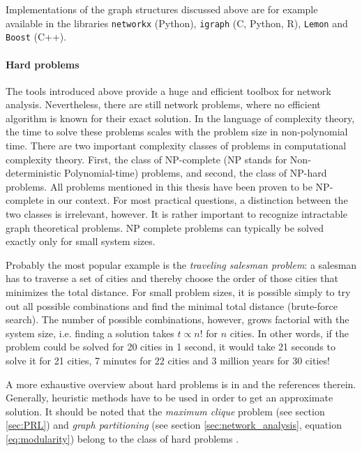 Implementations of the graph structures discussed above are for example available in the libraries \verb"networkx" (Python), \verb"igraph" (C, Python, R), \verb"Lemon" and \verb"Boost" (C++).

\paragraph{Hard problems\color{Cayenne}{.}}
The tools introduced above provide a huge and efficient toolbox for network analysis.
Nevertheless, there are still network problems, where no efficient algorithm is known for their exact solution.
In the language of complexity theory, the time to solve these problems scales with the problem size in non-polynomial time.
There are two important complexity classes of problems in computational complexity theory.
First, the class of NP-complete (NP stands for Non-deterministic Polynomial-time) problems, and second, the class of NP-hard problems.
All problems mentioned in this thesis have been proven to be NP-complete in our context.
For most practical questions, a distinction between the two classes is irrelevant, however.
It is rather important to recognize intractable graph theoretical problems.
NP complete problems can typically be solved exactly only for small system sizes.

Probably the most popular example is the \emph{traveling salesman problem}: a salesman has to traverse a set of cities and thereby choose the order of those cities that minimizes the total distance.
For small problem sizes, it is possible simply to try out all possible combinations and find the minimal total distance (brute-force search).
The number of possible combinations, however, grows factorial with the system size, i.e. finding a solution takes $t\propto n!$ for $n$ cities.
In other words, if the problem could be solved for 20 cities in 1 second, it would take 21 seconds to solve it for 21 cities, 7 minutes for 22 cities and 3 million years for 30 cities!

A more exhaustive overview about hard problems is in \citep{algorithm_design} and the references therein.
Generally, heuristic methods have to be used in order to get an approximate solution.
It should be noted that the \emph{maximum clique} problem (see section \ref{sec:PRL}) and \emph{graph partitioning} (see section \ref{sec:network_analysis}, equation \eqref{eq:modularity}) belong to the class of hard problems \citep{brandes2007}.

